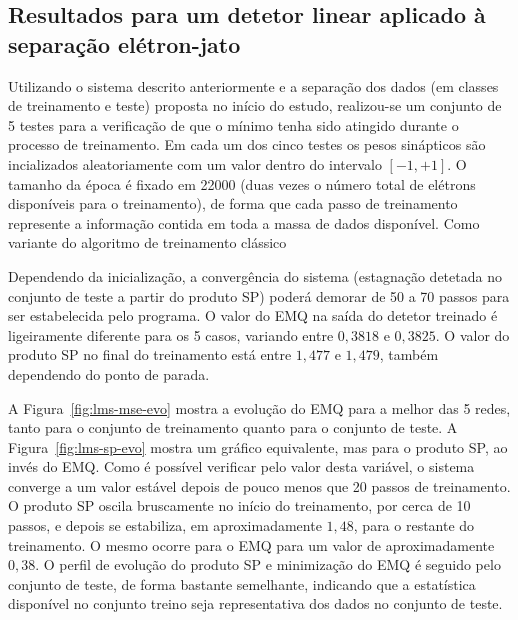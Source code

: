 \subsection{Resultados para um detetor linear aplicado à separação
e\-lé\-tron-jato}

Utilizando o sistema descrito anteriormente e a separação dos dados (em
classes de treinamento e teste) proposta no início do estudo, realizou-se um
conjunto de 5 testes para a verificação de que o mínimo tenha sido atingido
durante o processo de treinamento. Em cada um dos cinco testes os pesos
sinápticos são incializados aleatoriamente com um valor dentro do intervalo
$[-1, +1]$. O tamanho da época é fixado em 22000 (duas vezes o número total de
elétrons disponíveis para o treinamento), de forma que cada passo de
treinamento represente a informação contida em toda a massa de dados
disponível. Como variante do algoritmo de treinamento clássico

Dependendo da inicialização, a convergência do sistema (estagnação detetada no
conjunto de teste a partir do produto SP) poderá demorar de 50 a 70 passos
para ser estabelecida pelo programa. O valor do EMQ na saída do detetor
treinado é ligeiramente diferente para os 5 casos, variando entre $0,3818$ e
$0,3825$. O valor do produto SP no final do treinamento está entre $1,477$ e
$1,479$, também dependendo do ponto de parada.

A Figura~\ref{fig:lms-mse-evo} mostra a evolução do EMQ para a melhor das 5
redes, tanto para o conjunto de treinamento quanto para o conjunto de teste. A
Figura~\ref{fig:lms-sp-evo} mostra um gráfico equivalente, mas para o produto
SP, ao invés do EMQ. Como é possível verificar pelo valor desta variável, o
sistema converge a um valor estável depois de pouco menos que 20 passos de
treinamento. O produto SP oscila bruscamente no início do treinamento, por
cerca de 10 passos, e depois se estabiliza, em aproximadamente $1,48$, para o
restante do treinamento. O mesmo ocorre para o EMQ para um valor de
aproximadamente $0,38$. O perfil de evolução do produto SP e minimização do
EMQ é seguido pelo conjunto de teste, de forma bastante semelhante, indicando
que a estatística disponível no conjunto treino seja representativa dos dados
no conjunto de teste.


